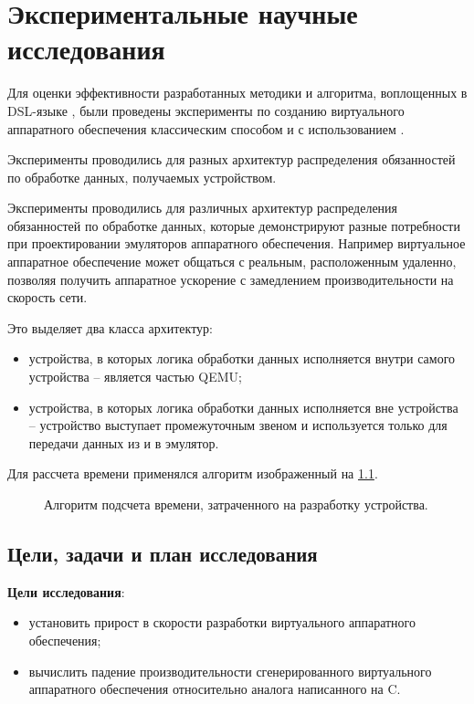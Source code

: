 \chapter{Экспериментальные научные исследования}\label{ch:ch3}

Для оценки эффективности разработанных методики и алгоритма,
воплощенных в DSL-языке {\mylanguage}, были проведены эксперименты
по созданию виртуального аппаратного обеспечения классическим способом
и с использованием {\mylanguage}.

Эксперименты проводились для разных архитектур распределения обязанностей
по обработке данных, получаемых устройством.

Эксперименты проводились для различных архитектур распределения обязанностей
по обработке данных, которые демонстрируют разные потребности при
проектировании эмуляторов аппаратного обеспечения.
Например виртуальное аппаратное обеспечение может общаться с реальным, расположенным удаленно,
позволяя получить аппаратное ускорение с замедлением производительности на
скорость сети.

Это выделяет два класса архитектур:
\begin{itemize}
    \item устройства, в которых логика обработки данных исполняется внутри самого устройства --
          является частью QEMU;
    \item устройства, в которых логика обработки данных исполняется вне устройства --
          устройство выступает промежуточным звеном и используется только для
          передачи данных из и в эмулятор.
\end{itemize}

Для рассчета времени применялся алгоритм изображенный на \cref{fig:git-hours}.

\begin{figure}[!htbp]
    \centering
    
    \caption{Алгоритм подсчета времени, затраченного на разработку устройства.}\label{fig:git-hours}
\end{figure}


\section{Цели, задачи и план исследования}\label{sec:ch3/sec1}

\textbf{Цели исследования}:
\begin{itemize}
    \item установить прирост в скорости разработки виртуального аппаратного обеспечения;
    \item вычислить падение производительности сгенерированного виртуального аппаратного обеспечения
    относительно аналога написанного на C.
\end{itemize}


